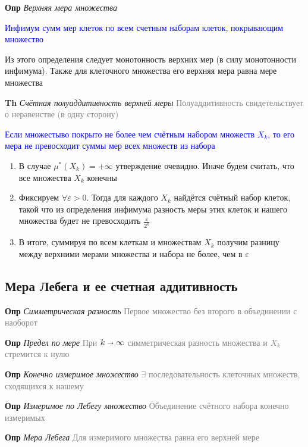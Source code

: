 \textbf{Опр} \textit{Верхняя мера множества}

\textcolor{blue}{Инфимум сумм мер клеток по всем счетным наборам клеток, покрывающим множество}

Из этого определения следует монотонность верхних мер (в силу монотонности инфимума).
Также для клеточного множества его верхняя мера равна мере множества

\textbf{Th} \textit{Счётная полуаддитивность верхней меры} \textcolor{gray}{Полуаддитивность свидетельствует о
неравенстве (в одну сторону)}

\textcolor{blue}{Если множестыво покрыто не более чем счётным набором множеств $X_k$, то его мера не превосходит суммы
мер всех множеств из набора}

\begin{enumerate}
    \item В случае $\mu^*(X_k) = +\infty$ утверждение очевидно.
    Иначе будем считать, что все множества $X_k$ конечны
    \item Фиксируем $\forall \varepsilon > 0$.
    Тогда для каждого $X_k$ найдётся счётный набор клеток, такой что из определения инфимума разность меры этих клеток и
    нашего множества будет не превосходить $\frac{\varepsilon}{2^k}$
    \item В итоге, суммируя по всем клеткам и множествам $X_k$ получим разницу между верхними мерами множества и
    набора не более, чем в $\varepsilon$
\end{enumerate}

\subsection{Мера Лебега и ее счетная аддитивность}

\textbf{Опр} \textit{Симметрическая разность} \textcolor{gray}{Первое множество без второго в объединении с наоборот}

\textbf{Опр} \textit{Предел по мере} \textcolor{gray}{При $k \shortrightarrow \infty$ симметрическая разность
множества и $X_k$ стремится к нулю}

\textbf{Опр} \textit{Конечно измеримое множество} \textcolor{gray}{$\exists$ последовательность клеточных множеств, сходящихся к нашему}

\textbf{Опр} \textit{Измеримое по Лебегу множество} \textcolor{gray}{Объединение счётного набора конечно измеримых}

\textbf{Опр} \textit{Мера Лебега} \textcolor{gray}{Для измеримого множества равна его верхней мере}

